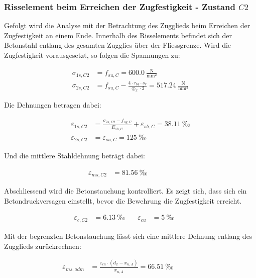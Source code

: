 \documentclass[
  11pt,
  letterpaper,
]{scrreprt}
\begin{document}
\subsubsection{\texorpdfstring{Risselement beim Erreichen der
Zugfestigkeit - Zustand
\(C2\)}{Risselement beim Erreichen der Zugfestigkeit - Zustand C2}}\label{risselement-beim-erreichen-der-zugfestigkeit---zustand-c2}

Gefolgt wird die Analyse mit der Betrachtung des Zugglieds beim
Erreichen der Zugfestigkeit an einem Ende. Innerhalb des Risselements
befindet sich der Betonstahl entlang des gesamten Zugglies über der
Fliessgrenze. Wird die Zugfestigkeit vorausgesetzt, so folgen die
Spannungen zu:

\[
\begin{aligned}
\sigma_{1 s , C2}& = f_{su , C} = 600.0 \ \frac{\mathrm{N}}{\mathrm{mm}^{2}} \\ 
\sigma_{2 s , C2}& = f_{su , C} - \frac{4 \cdot \tau_{b1} \cdot s_{r}}{\oslash_{x} \cdot 2} = 517.24 \ \frac{\mathrm{N}}{\mathrm{mm}^{2}} \end{aligned}
\]

Die Dehnungen betragen dabei:

\[
\begin{aligned}
\varepsilon_{1 s , C2}& = \frac{\sigma_{2 s , C2} - f_{sy , C}}{E_{sh , C}} + \varepsilon_{sh , C} = 38.11 \ \mathrm{‰} \\ 
\varepsilon_{2 s , C2}& = \varepsilon_{su , C} = 125 \ \mathrm{‰} \end{aligned}
\]

Und die mittlere Stahldehnung beträgt dabei:

\[
\begin{aligned}
\varepsilon_{m s , C2}& = 81.56 \ \mathrm{‰} \quad &  \quad &  
 \end{aligned}
\]

Abschliessend wird die Betonstauchung kontrolliert. Es zeigt sich, dass
sich ein Betondruckversagen einstellt, bevor die Bewehrung die
Zugfestigkeit erreicht.

\[
\begin{aligned}
\varepsilon_{c , C2}& = 6.13 \ \mathrm{‰} \quad & \varepsilon_{cu}& = 5 \ \mathrm{‰} \quad &  
 \end{aligned}
\]

Mit der begrenzten Betonstauchung lässt sich eine mittlere Dehnung
entlang des Zugglieds zurückrechnen:

\[
\begin{aligned}
\varepsilon_{m s , adm}& = \frac{\varepsilon_{cu} \cdot \left(d_{x} - x_{u , A}\right)}{x_{u , A}} = 66.51 \ \mathrm{‰} \quad &  \quad &  
 \end{aligned}
\]
\end{document}
